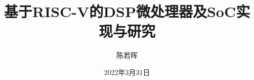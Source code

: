\documentclass[unicode,master,pdfcover]{scutthesis} %
\renewcommand{\chaptermark}[1]{\markboth{\chaptername\ #1}{}}
\begin{document}
	\title{基于RISC-V的DSP微处理器及SoC实现与研究}	
	\author{陈若晖}	
	\date{2022年3月31日}
	\maketitle	
	\frontmatter	%
	\tableofcontents	%
	
	\mainmatter %
	
    \pagestyle{fancy}	%
	

	\backmatter %
	\renewcommand{\chaptermark}[1]{\markboth{#1}{}}
	\printbibliography	%
% 	
\end{document}
